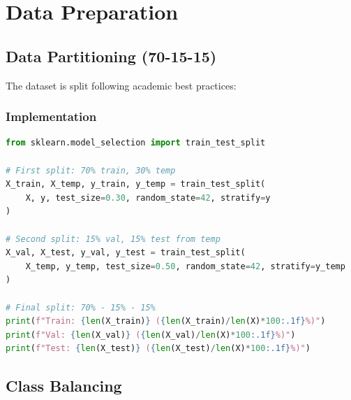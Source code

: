 \documentclass[12pt,a4paper]{report}
\begin{document}
\chapter{Data Preparation}

\section{Data Partitioning (70-15-15)}

The dataset is split following academic best practices:

\begin{center}
\end{center}

\subsection{Implementation}

\begin{lstlisting}[language=Python, caption={Data Splitting Implementation}]
from sklearn.model_selection import train_test_split

# First split: 70% train, 30% temp
X_train, X_temp, y_train, y_temp = train_test_split(
    X, y, test_size=0.30, random_state=42, stratify=y
)

# Second split: 15% val, 15% test from temp
X_val, X_test, y_val, y_test = train_test_split(
    X_temp, y_temp, test_size=0.50, random_state=42, stratify=y_temp
)

# Final split: 70% - 15% - 15%
print(f"Train: {len(X_train)} ({len(X_train)/len(X)*100:.1f}%)")
print(f"Val: {len(X_val)} ({len(X_val)/len(X)*100:.1f}%)")
print(f"Test: {len(X_test)} ({len(X_test)/len(X)*100:.1f}%)")
\end{lstlisting}

\section{Class Balancing}
\end{document}
